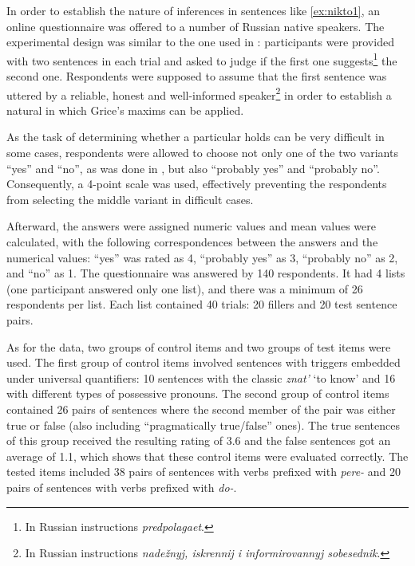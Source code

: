 In order to establish the nature of inferences in sentences like \ref{ex:nikto1}, an online questionnaire was offered to a number of Russian native speakers. The experimental design was similar to the one used in \citealt{Chemla:09}: participants were provided with two sentences in each trial and asked to judge if the first one suggests\footnote{In Russian instructions \textit{predpolagaet}.} the second one. Respondents were supposed to assume that the first sentence was uttered by a reliable, honest and well-informed speaker\footnote{In Russian instructions \textit{nade\v{z}nyj, iskrennij i informirovannyj sobesednik}.} in order to establish a natural  in which Grice's maxims can be applied.

As the task of determining whether a particular  holds can be very difficult in some cases, respondents were allowed to choose not only one of the two variants ``yes'' and ``no'', as was done in \citealt{Chemla:09}, but also ``probably yes'' and ``probably no''. Consequently, a 4-point scale was used, effectively preventing the respondents from selecting the middle variant in difficult cases.

Afterward, the answers were assigned numeric values and mean values were calculated, with the following correspondences between the answers and the numerical values: ``yes'' was rated as 4, ``probably yes'' as 3, ``probably no'' as 2, and ``no'' as 1. The questionnaire was answered by 140 respondents. It had 4 lists (one participant answered only one list), and there was a minimum of 26 respondents per list. Each list contained 40 trials: 20 fillers and 20 test sentence pairs.

As for the data, two groups of control items and two groups of test items were used. The first group of control items involved sentences with  triggers embedded under universal quantifiers: 10 sentences with the classic  \textit{znat'} `to know' and 16 with different types of possessive pronouns. The second group of control items contained 26 pairs of sentences where the second member of the pair was either true or false (also including ``pragmatically true/false'' ones). The true sentences of this group received the resulting rating of 3.6 and the false sentences got an average of 1.1, which shows that these control items were evaluated correctly. The tested items included 38 pairs of sentences with verbs prefixed with \textit{pere-} and 20 pairs of sentences with verbs prefixed with \textit{do-}.

